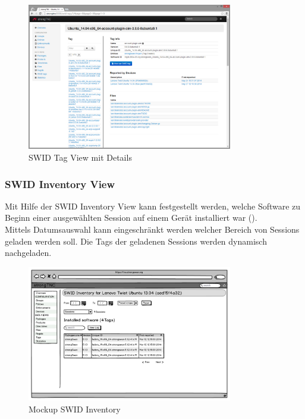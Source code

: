 \begin{figure}[H]
	\centering
	\includegraphics[width=0.8\textwidth]{./images/Views/tag-detail-view}
	\caption{SWID Tag View mit Details}
	\label{fig:swid-tag-view}
\end{figure}


\subsubsection{SWID Inventory View}
Mit Hilfe der SWID Inventory View kann festgestellt werden, welche Software zu Beginn 
einer ausgewählten Session auf einem Gerät installiert war
().\\
Mittels Datumsauswahl kann eingeschränkt werden welcher Bereich von Sessions
geladen werden soll. Die Tags der geladenen Sessions werden dynamisch
nachgeladen.

\begin{figure}[H]
	\centering
	\includegraphics[width=0.8\textwidth]{./images/mockups/swid-inventory}
	\caption{Mockup SWID Inventory}
	\label{fig:swid-inventory-view-mockup}
\end{figure}

